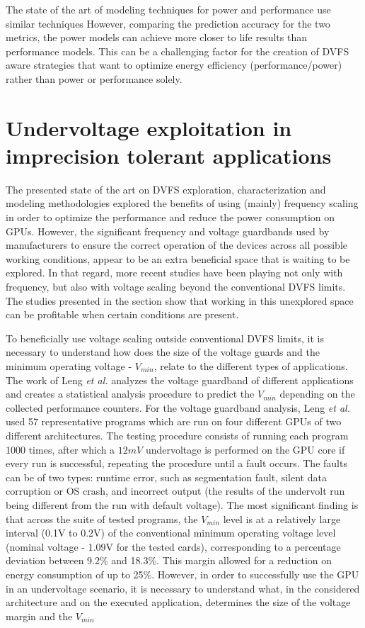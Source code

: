 \bigskip
The state of the art of modeling techniques for power and performance use similar techniques However, comparing the prediction accuracy for the two metrics, the power models can achieve more closer to life results than performance models. This can be a challenging factor for the creation of DVFS aware strategies that want to optimize energy efficiency (performance/power) rather than power or performance solely.

\section{Undervoltage exploitation in imprecision tolerant applications}

The presented state of the art on DVFS exploration, characterization and modeling methodologies explored the benefits of using (mainly) frequency scaling in order to optimize the performance and reduce the power consumption on GPUs. However, the significant frequency and voltage guardbands used by manufacturers to ensure the correct operation of the devices across all possible working conditions, appear to be an extra beneficial space that is waiting to be explored.  In that regard, more recent studies have been playing not only with frequency, but also with voltage scaling beyond the conventional DVFS limits. The studies presented in the section show that working in this unexplored space can be profitable when certain conditions are present.

To beneficially use voltage scaling outside conventional DVFS limits, it is necessary to understand how does the size of the voltage guards and the minimum operating voltage - $V_{min}$, relate to the different types of applications. The work of Leng \textit{et al.} \cite{leng_safe_2015} analyzes the voltage guardband of different applications and creates a statistical analysis procedure to predict the $V_{min}$ depending on the collected performance counters. For the voltage guardband analysis, Leng \textit{et al.} used 57 representative programs which are run on four different GPUs of two different architectures. The testing procedure consists of running each program 1000 times, after which a $12mV$ undervoltage is performed on the GPU core if every run is successful, repeating the procedure until a fault occurs. The faults can be of two types: runtime error, such as segmentation fault, silent data corruption or OS crash, and incorrect output (the results of the undervolt run being different from the run with default voltage).  The most significant finding is that across the suite of tested programs, the $V_{min}$ level is at a relatively large interval (0.1V to 0.2V) of the conventional minimum operating voltage level (nominal voltage - 1.09V for the tested cards), corresponding to a percentage deviation between 9.2\% and 18.3\%. This margin allowed for a reduction on energy consumption of up to 25\%. However, in order to successfully use the GPU in an undervoltage scenario, it is necessary to understand what, in the considered architecture and on the executed application, determines the size of the voltage margin and the $V_{min}$ 

